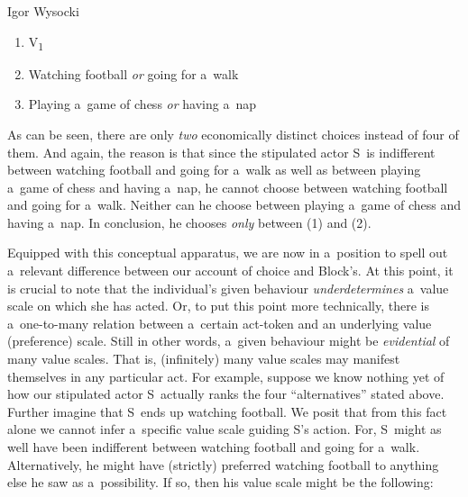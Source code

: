 \begin{artengenv}{Igor Wysocki}
\begin{enumerate}[label=(\arabic*)]

\item[]\makebox[-1.7em][l]{}V\textsubscript{1}

\item Watching football \textit{or} going for a~walk

\item Playing a~game of chess \textit{or} having a~nap

\end{enumerate}

As can be seen, there are only \textit{two} economically distinct choices instead of four of them. And again, the reason is that since the stipulated actor S~is indifferent between watching football and going for a~walk as well as between playing a~game of chess and having a~nap, he cannot choose between watching football and going for a~walk. Neither can he choose between playing a~game of chess and having a~nap. In conclusion, he chooses \textit{only} between (1) and (2).



Equipped with this conceptual apparatus, we are now in a~position to spell out a~relevant difference between our account of choice and Block's. At this point, it is crucial to note that the individual's given behaviour \textit{underdetermines} a~value scale on which she has acted. Or, to put this point more technically, there is a~one-to-many relation between a~certain act-token and an underlying value (preference) scale. Still in other words, a~given behaviour might be \textit{evidential} of many value scales. That is, (infinitely) many value scales may manifest themselves in any particular act. For example, suppose we know nothing yet of how our stipulated actor S~actually ranks the four ``alternatives'' stated above. Further imagine that S~ends up watching football. We posit that from this fact alone we cannot infer a~specific value scale guiding S's action. For, S~might as well have been indifferent between watching football and going for a~walk. Alternatively, he might have (strictly) preferred watching football to anything else he saw as a~possibility. If so, then his value scale might be the following:






\begin{enumerate}[label=(\arabic*)]


\end{enumerate}
\end{artengenv}
